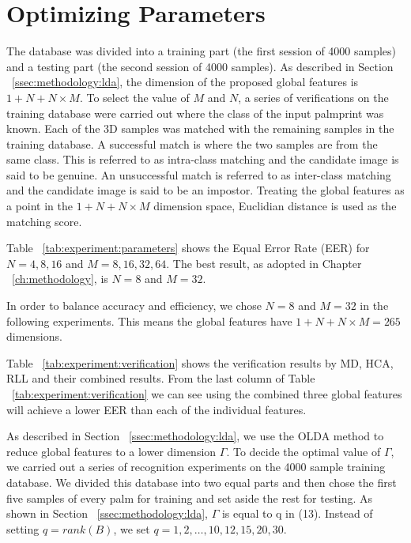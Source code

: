 \section{Optimizing Parameters}
\label{sec:experiment:parameters}

The database was divided into a training part (the first session of 4000 samples) and a testing part (the second session of 4000 samples). As described in Section ~\ref{ssec:methodology:lda}, the dimension of the proposed global features is $1+N+N\times M$. To select the value of $M$ and $N$, a series of verifications on the training database were carried out where the class of the input palmprint was known. Each of the 3D samples was matched with the remaining samples in the training database. A successful match is where the two samples are from the same class. This is referred to as intra-class matching and the candidate image is said to be genuine. An unsuccessful match is referred to as inter-class matching and the candidate image is said to be an impostor. Treating the global features as a point in the $1+N+N\times M$ dimension space, Euclidian distance is used as the matching score.




Table ~\ref{tab:experiment:parameters} shows the Equal Error Rate (EER) for $N=4,8,16$ and $M=8,16,32,64$. The best result, as adopted in Chapter ~\ref{ch:methodology}, is $N=8$ and $M=32$.


In order to balance accuracy and efficiency, we chose $N=8$ and $M=32$ in the following experiments. This means the global features have $1+N+N\times M=265$ dimensions.



Table ~\ref{tab:experiment:verification} shows the verification results by MD, HCA, RLL and their combined results. From the last column of Table ~\ref{tab:experiment:verification} we can see using the combined three global features will achieve a lower EER than each of the individual features.

As described in Section ~\ref{ssec:methodology:lda}, we use the OLDA method to reduce global features to a lower dimension $\Gamma$. To decide the optimal value of $\Gamma$, we carried out a series of recognition experiments on the 4000 sample training database. We divided this database into two equal parts and then chose the first five samples of every palm for training and set aside the rest for testing. As shown in Section ~\ref{ssec:methodology:lda}, $\Gamma$ is equal to q in (13). Instead of setting $q=rank(B)$, we set $q=1,2,\dots,10,12,15,20,30$.

